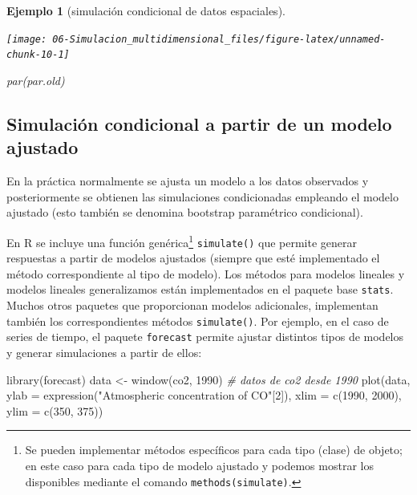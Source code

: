 \documentclass[
]{book}
\newenvironment{Shaded}{\begin{snugshade}}{\end{snugshade}}
\newcommand{\AttributeTok}[1]{\textcolor[rgb]{0.77,0.63,0.00}{#1}}
\newcommand{\CommentTok}[1]{\textcolor[rgb]{0.56,0.35,0.01}{\textit{#1}}}
\newcommand{\DecValTok}[1]{\textcolor[rgb]{0.00,0.00,0.81}{#1}}
\newcommand{\FunctionTok}[1]{\textcolor[rgb]{0.00,0.00,0.00}{#1}}
\newcommand{\NormalTok}[1]{#1}
\newcommand{\OtherTok}[1]{\textcolor[rgb]{0.56,0.35,0.01}{#1}}
\newcommand{\StringTok}[1]{\textcolor[rgb]{0.31,0.60,0.02}{#1}}
\theoremstyle{break}
\newtheorem{example}{Ejemplo}[chapter]
\theoremstyle{nonumberplain}
\begin{document}
\begin{example}[simulación condicional de datos espaciales]
\begin{center}\texttt{[image: 06-Simulacion\_multidimensional\_files/figure-latex/unnamed-chunk-10-1]} \end{center}

\begin{Shaded}
\begin{Highlighting}[]
\FunctionTok{par}\NormalTok{(par.old)}
\end{Highlighting}
\end{Shaded}

\end{example}

\hypertarget{simulaciuxf3n-condicional-a-partir-de-un-modelo-ajustado}{%
\subsection{Simulación condicional a partir de un modelo ajustado}\label{simulaciuxf3n-condicional-a-partir-de-un-modelo-ajustado}}

En la práctica normalmente se ajusta un modelo a los datos observados y posteriormente se obtienen las simulaciones condicionadas empleando el modelo ajustado
(esto también se denomina bootstrap paramétrico condicional).

En R se incluye una función genérica\footnote{Se pueden implementar métodos específicos para cada tipo (clase) de objeto; en este caso para cada tipo de modelo ajustado y podemos mostrar los disponibles mediante el comando \texttt{methods(simulate)}.} \texttt{simulate()} que permite generar respuestas a partir de modelos ajustados (siempre que esté implementado el método correspondiente al tipo de modelo).
Los métodos para modelos lineales y modelos lineales generalizamos están implementados en el paquete base \texttt{stats}.
Muchos otros paquetes que proporcionan modelos adicionales, implementan también los correspondientes métodos \texttt{simulate()}.
Por ejemplo, en el caso de series de tiempo, el paquete \texttt{forecast} permite ajustar distintos tipos de modelos y generar simulaciones a partir de ellos:

\begin{Shaded}
\begin{Highlighting}[]
\FunctionTok{library}\NormalTok{(forecast)}
\NormalTok{data }\OtherTok{\textless{}{-}} \FunctionTok{window}\NormalTok{(co2, }\DecValTok{1990}\NormalTok{) }\CommentTok{\# datos de co2 desde 1990}
\FunctionTok{plot}\NormalTok{(data, }\AttributeTok{ylab =} \FunctionTok{expression}\NormalTok{(}\StringTok{"Atmospheric concentration of CO"}\NormalTok{[}\DecValTok{2}\NormalTok{]),}
     \AttributeTok{xlim =} \FunctionTok{c}\NormalTok{(}\DecValTok{1990}\NormalTok{, }\DecValTok{2000}\NormalTok{), }\AttributeTok{ylim =} \FunctionTok{c}\NormalTok{(}\DecValTok{350}\NormalTok{, }\DecValTok{375}\NormalTok{))}
\end{Highlighting}
\end{Shaded}
\end{document}
